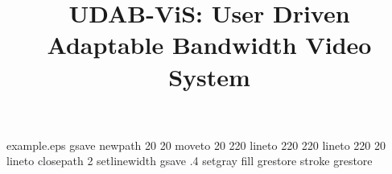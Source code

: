 %
%
%
%
%
\begin{filecontents*}{example.eps}
gsave
newpath
  20 20 moveto
  20 220 lineto
  220 220 lineto
  220 20 lineto
closepath
2 setlinewidth
gsave
  .4 setgray fill
grestore
stroke
grestore
\end{filecontents*}
%
\RequirePackage{fix-cm}
%
\documentclass[smallextended]{svjour3}       %
%
\smartqed  %
%
\usepackage{graphicx}
\usepackage{graphics}
\usepackage{listings}
\usepackage{amsmath}
\usepackage{url}
\usepackage{color}
\usepackage{float}

		{
			  morestring=[b]",
			    morestring=[s]{>}{<},
				  morecomment=[s]{<?}{?>},
				    stringstyle=\color{black},
					  identifierstyle=\color{darkblue},
					    keywordstyle=\color{cyan},
						  morekeywords={xmlns,version,type, action}%
					  }
%
%
%
%
%


\title{UDAB-ViS: User Driven Adaptable Bandwidth Video System%
}

